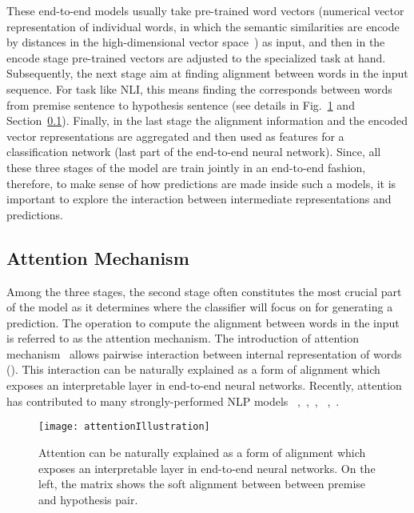 These end-to-end models usually take pre-trained word vectors (numerical vector representation of individual words, in which the semantic similarities are encode by distances in the high-dimensional vector space~\cite{MikolovSutskeverChen2013, PenningtonSocherManning2014}) as input, and then in the encode stage pre-trained vectors are adjusted to the specialized task at hand. Subsequently, the next stage aim at finding alignment between words in the input sequence. For task like NLI, this means finding the corresponds between words from premise sentence to hypothesis sentence (see details in Fig.~\ref{fig:attention} and Section~\ref{sec:attention}). Finally, in the last stage the alignment information and the encoded vector representations are aggregated and then used as features for a classification network (last part of the end-to-end neural network).
%
Since, all these three stages of the model are train jointly in an end-to-end fashion, therefore, to make sense of how predictions are made inside such a models, it is important to explore the interaction between intermediate representations and predictions.

\subsection{Attention Mechanism}
\label{sec:attention}
Among the three stages, the second stage often constitutes the most crucial part of the model as it determines where the classifier will focus on for generating a prediction. The operation to compute the alignment between words in the input is referred to as the attention mechanism. 
The introduction of attention mechanism~\cite{bahdanau2014neural} allows
pairwise interaction between internal representation of words (). 
This interaction can be naturally explained as a form of alignment which exposes an interpretable layer in end-to-end neural networks.
%
Recently, attention has contributed to many strongly-performed NLP models
~\cite{parikh2016emnlp},~\cite{rush2015neural},~\cite{yang2016hierarchical},
~\cite{seo2016bidirectional},~\cite{schwartz2017high}.

\begin{figure}[htbp]
\centering
\vspace{-2mm}
 \texttt{[image: attentionIllustration]}
 \caption{Attention can be naturally explained as a form of alignment which exposes an interpretable layer in end-to-end neural networks. On the left, the matrix shows the soft alignment between between premise and hypothesis pair.}
\label{fig:attention}
\end{figure}

